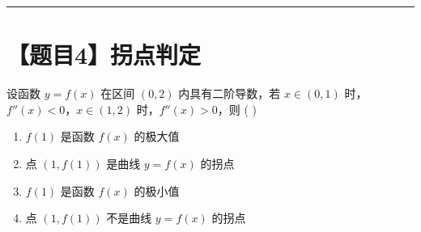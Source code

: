 \documentclass[UTF8,10pt]{ctexart}
\newcommand{\problemrule}{\par\filbreak\noindent\rule{\textwidth}{1.5pt}\vspace{-0.5em}}
\begin{document}
\problemrule
\section*{【题目4】拐点判定}
设函数 $y = f(x)$ 在区间 $(0,2)$ 内具有二阶导数，若 $x \in (0,1)$ 时，$f''(x) < 0$，$x \in (1,2)$ 时，$f''(x) > 0$，则 ( \quad )
\begin{enumerate}[label=\Alph*.]
    \item $f(1)$ 是函数 $f(x)$ 的极大值
    \item 点 $(1, f(1))$ 是曲线 $y = f(x)$ 的拐点
    \item $f(1)$ 是函数 $f(x)$ 的极小值
    \item 点 $(1, f(1))$ 不是曲线 $y = f(x)$ 的拐点
\end{enumerate}
\end{document}
